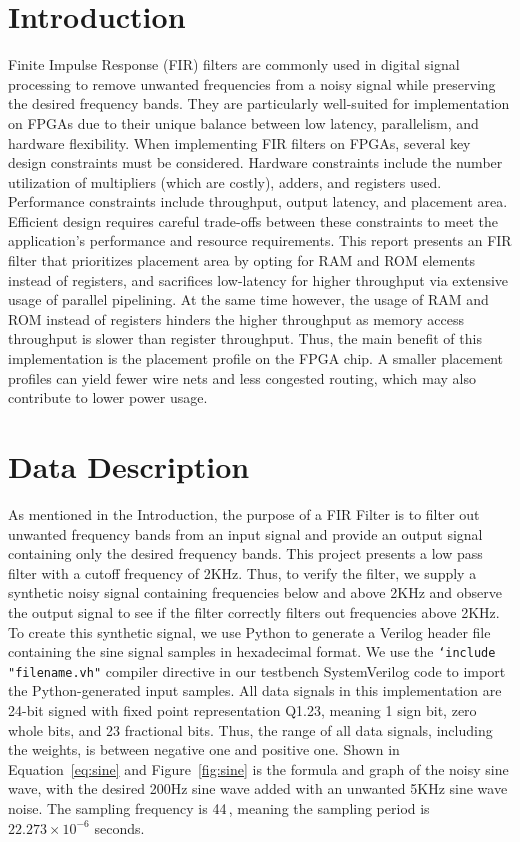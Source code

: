 \documentclass{article}
\begin{document}
\section{Introduction}
    Finite Impulse Response (FIR) filters are commonly used in digital signal processing to remove unwanted frequencies from a noisy signal while preserving the desired frequency bands.
    They are particularly well-suited for implementation on FPGAs due to their unique balance between low latency, parallelism, and hardware flexibility.
    When implementing FIR filters on FPGAs, several key design constraints must be considered.
    Hardware constraints include the number utilization of multipliers (which are costly), adders, and registers used.
    Performance constraints include throughput, output latency, and placement area.
    Efficient design requires careful trade-offs between these constraints to meet the application's performance and resource requirements.
    This report presents an FIR filter that prioritizes placement area by opting for RAM and ROM elements instead of registers, and sacrifices low-latency for higher throughput via extensive usage of parallel pipelining.
    At the same time however, the usage of RAM and ROM instead of registers hinders the higher throughput as memory access throughput is slower than register throughput.
    Thus, the main benefit of this implementation is the placement profile on the FPGA chip.
    A smaller placement profiles can yield fewer wire nets and less congested routing, which may also contribute to lower power usage.

\section{Data Description}
    As mentioned in the Introduction, the purpose of a FIR Filter is to filter out unwanted frequency bands from an input signal and provide an output signal containing only the desired frequency bands.
    This project presents a low pass filter with a cutoff frequency of 2KHz.
    Thus, to verify the filter, we supply a synthetic noisy signal containing frequencies below and above 2KHz and observe the output signal to see if the filter correctly filters out frequencies above 2KHz.
    To create this synthetic signal, we use Python to generate a Verilog header file containing the sine signal samples in hexadecimal format.
    We use the \texttt{`include "filename.vh"} compiler directive in our testbench SystemVerilog code to import the Python-generated input samples.
    All data signals in this implementation are 24-bit signed with fixed point representation Q1.23, meaning 1 sign bit, zero whole bits, and 23 fractional bits.
    Thus, the range of all data signals, including the weights, is between negative one and positive one.
    Shown in Equation~\ref{eq:sine} and Figure~\ref{fig:sine} is the formula and graph of the noisy sine wave, with the desired 200Hz sine wave added with an unwanted 5KHz sine wave noise.
    The sampling frequency is 44\,, meaning the sampling period is \( 22.273 \times 10^{-6} \) seconds.
\end{document}
